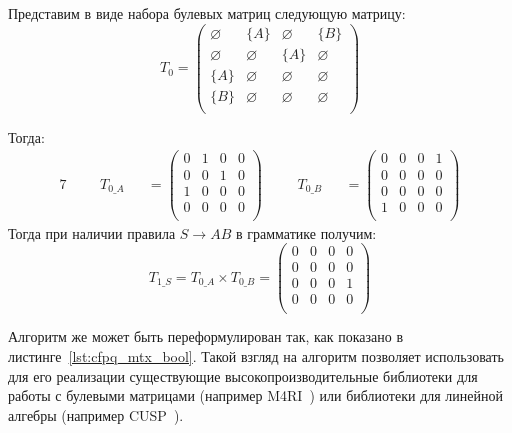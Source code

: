 \begin{example}
Представим в виде набора булевых матриц следующую матрицу:
\[
T_0 = \begin{pmatrix}
\varnothing & \{A\}       & \varnothing & \{B\}       \\
\varnothing & \varnothing & \{A\}       & \varnothing \\
\{A\}       & \varnothing & \varnothing & \varnothing \\
\{B\}       & \varnothing & \varnothing & \varnothing \\
\end{pmatrix}
\]

Тогда:
\begin{alignat*}{7}
& &&T_{0\_A} &&= \begin{pmatrix}
0 & 1       & 0 & 0       \\
0 & 0 & 1       & 0 \\
1  & 0 & 0 & 0       \\
0       & 0 & 0 & 0 \\
\end{pmatrix} \ \ \ \ &&T_{0\_B} &&= \begin{pmatrix}
0 & 0       & 0 & 1       \\
0       & 0 & 0       & 0 \\
0  & 0 & 0 & 0       \\
1       & 0 & 0 & 0 \\
\end{pmatrix}
\end{alignat*}
Тогда при наличии правила $S \to A B$ в грамматике получим:
\[
T_{1\_S} =T_{0\_A} \times T_{0\_B} = \begin{pmatrix}
0 & 0       & 0 & 0       \\
0       & 0 & 0       & 0 \\
0  & 0 & 0 & 1       \\
0       & 0 & 0 & 0 \\
\end{pmatrix}
\]
\end{example}

Алгоритм же может быть переформулирован так, как показано в листинге~\ref{lst:cfpq_mtx_bool}.
Такой взгляд на алгоритм позволяет использовать для его реализации существующие высокопроизводительные библиотеки для работы с булевыми матрицами (например M4RI~\cite{DBLP:journals/corr/abs-0811-1714}) или библиотеки для линейной алгебры (например CUSP~\cite{Cusp}).

